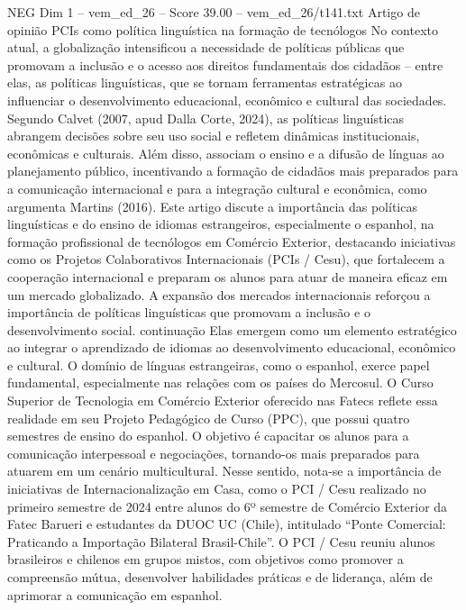 \begin{textsample}{NEG Dim 1 – vem\_ed\_26 – Score 39.00 – vem\_ed\_26/t141.txt}  \label{ex:f1_neg_131}
Artigo de opinião PCIs como política linguística na formação de tecnólogos No contexto atual, a globalização intensificou a necessidade de políticas públicas que promovam a inclusão e o acesso aos direitos fundamentais dos cidadãos – entre elas, as políticas linguísticas, que se tornam ferramentas estratégicas ao influenciar o desenvolvimento educacional, econômico e cultural das sociedades.
Segundo Calvet (2007, apud Dalla Corte, 2024), as políticas linguísticas abrangem decisões sobre seu uso social e refletem dinâmicas institucionais, econômicas e culturais.
Além disso, associam o ensino e a difusão de línguas ao planejamento público, incentivando a formação de cidadãos mais preparados para a comunicação internacional e para a integração cultural e econômica, como argumenta Martins (2016).
Este artigo discute a importância das políticas linguísticas e do ensino de idiomas estrangeiros, especialmente o espanhol, na formação profissional de tecnólogos em Comércio Exterior, destacando iniciativas como os Projetos Colaborativos Internacionais (PCIs / Cesu), que fortalecem a cooperação internacional e preparam os alunos para atuar de maneira eficaz em um mercado globalizado.
A expansão dos mercados internacionais reforçou a importância de políticas linguísticas que promovam a inclusão e o desenvolvimento social. continuação Elas emergem como um elemento estratégico ao integrar o aprendizado de idiomas ao desenvolvimento educacional, econômico e cultural.
O domínio de línguas estrangeiras, como o espanhol, exerce papel fundamental, especialmente nas relações com os países do Mercosul.
O Curso Superior de Tecnologia em Comércio Exterior oferecido nas Fatecs reflete essa realidade em seu Projeto Pedagógico de Curso (PPC), que possui quatro semestres de ensino do espanhol.
O objetivo é capacitar os alunos para a comunicação interpessoal e negociações, tornando-os mais preparados para atuarem em um cenário multicultural.
Nesse sentido, nota-se a importância de iniciativas de Internacionalização em Casa, como o PCI / Cesu realizado no primeiro semestre de 2024 entre alunos do 6º semestre de Comércio Exterior da Fatec Barueri e estudantes da DUOC UC (Chile), intitulado “Ponte Comercial: Praticando a Importação Bilateral Brasil-Chile”.
O PCI / Cesu reuniu alunos brasileiros e chilenos em grupos mistos, com objetivos como promover a compreensão mútua, desenvolver habilidades práticas e de liderança, além de aprimorar a comunicação em espanhol.

\end{textsample}
